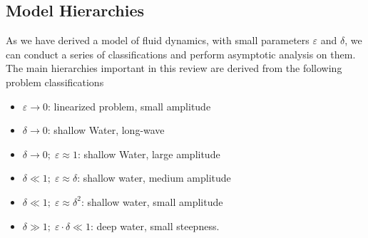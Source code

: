 \subsection{Model Hierarchies}
As we have derived a model of fluid dynamics, with small parameters
$\varepsilon$ and $\delta$, we can conduct a series of classifications and
perform asymptotic analysis on them. The main hierarchies important in this
review are derived from the following problem classifications
\begin{itemize}
    \item $\varepsilon\rightarrow 0$: linearized problem, small amplitude
    \item $\delta\rightarrow 0$: shallow Water, long-wave
    \item$\delta \rightarrow 0;\; \varepsilon\approx1$: shallow Water, large
        amplitude
    \item $\delta\ll 1;\; \varepsilon\approx\delta$: shallow water, medium
        amplitude
    \item $\delta\ll 1;\; \varepsilon\approx\delta^2$: shallow water, small
        amplitude
    \item $\delta \gg 1;\; \varepsilon\cdot\delta\ll 1$: deep water, small
        steepness.
\end{itemize}



